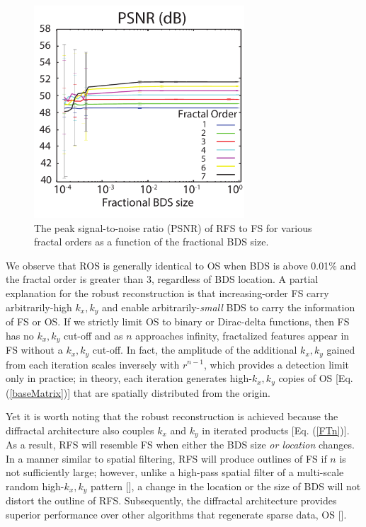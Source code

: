 \begin{figure}[t!]
\begin{centering}
 \includegraphics[width=0.7\textwidth]{psnr_good_eb2.pdf}
\caption{The peak signal-to-noise ratio (PSNR) of RFS to FS for various fractal orders as a function of the fractional BDS size.}
\label{PSNR}
\end{centering}
\end{figure}

We observe that ROS is generally identical to OS when BDS is above 0.01\% and the fractal order is greater than 3, regardless of BDS location. A partial explanation for the robust reconstruction is that increasing-order FS carry arbitrarily-high $k_x,k_y$ and enable arbitrarily-{\it small} BDS to carry the information of FS or OS.  If we strictly limit OS to binary or Dirac-delta functions, then FS has no $k_x,k_y$ cut-off and as $n$ approaches infinity, fractalized features appear in FS without a $k_x,k_y$ cut-off.  In fact, the amplitude of the additional $k_x,k_y$ gained from each iteration scales inversely with $r^{n-1}$, which provides a detection limit only in practice; in theory, each iteration generates high-$k_x,k_y$ copies of OS [Eq. (\ref{baseMatrix})] that are spatially distributed from the origin.  

Yet it is worth noting that the robust reconstruction is achieved because the diffractal architecture also couples $k_x$ and $k_y$ in iterated products [Eq. (\ref{FTn})].  As a result, RFS will resemble FS when either the BDS size {\it or location} changes.  In a manner similar to spatial filtering, RFS will produce outlines of FS if $n$ is not sufficiently large; however, unlike a high-pass spatial filter of a multi-scale random high-$k_x,k_y$ pattern [\cite{Kelly07}], a change in the location or the size of BDS will not distort the outline of RFS.  Subsequently, the diffractal architecture provides superior performance over other algorithms that regenerate sparse data, OS [\cite{Kelly07, Howland}].   


